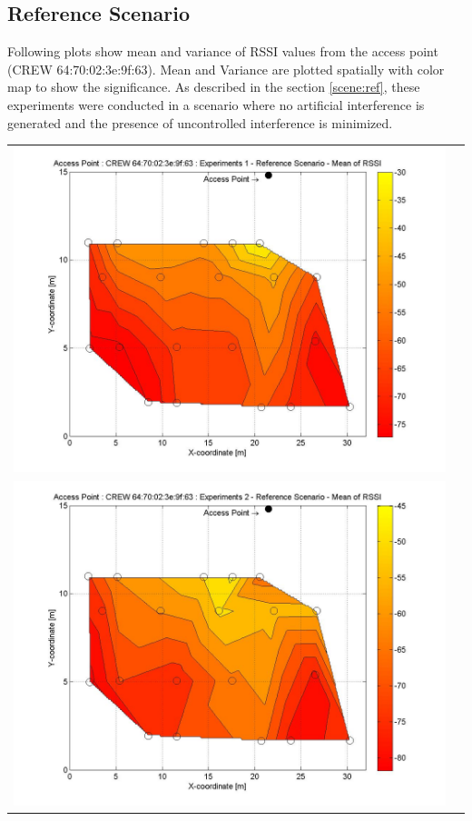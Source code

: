 \documentclass[11pt,a4paper,headinclude,footinclude,chapterprefix=on]{scrreprt}
\begin{document}
\subsection{Reference Scenario} 
Following plots show mean and variance of RSSI values from the access point (CREW 64:70:02:3e:9f:63). Mean and Variance are plotted spatially with color map to show the significance. As described in the section \ref{scene:ref}, these experiments were conducted in a scenario where no artificial interference is generated and the presence of uncontrolled interference is minimized.
\begin{longtable}
	{lr} 
	\includegraphics[width=13cm]{../../Source/plot/CREW_63/63_Ref_Ex_1_Mean.jpg} \\
	\includegraphics[width=13cm]{../../Source/plot/CREW_63/63_Ref_Ex_2_Mean.jpg} \\

\end{longtable}
\end{document}
